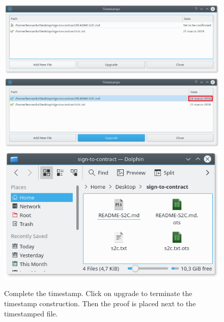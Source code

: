 \begin{figure}
	\begin{center}
		\includegraphics[width=\linewidth]{Images/pending-attestation.png}
		\includegraphics[width=\linewidth]{Images/post-upgrade.png}
		\includegraphics[width=0.7\linewidth]{Images/file-and-ots.png}
		\caption[Complete the timestamp]{Complete the timestamp. Click on upgrade to terminate the timestamp construction. Then the proof is placed next to the timestamped file.}
		\label{fig:upgrade}
	\end{center}
\end{figure} 